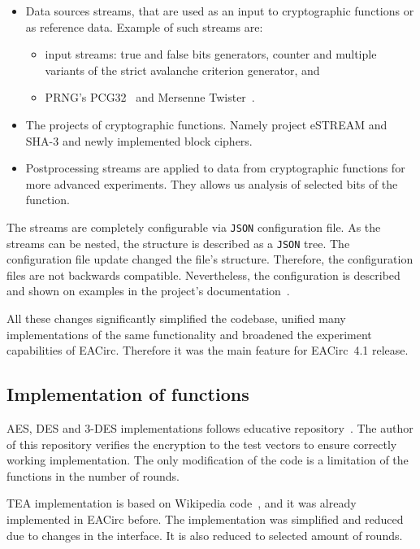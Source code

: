 \documentclass[
  print, %
  Table,   %
  nolof,     %
  nolot,     %
  11pt, %
  oneside  %
]{fithesis3}
\begin{document}
\begin{itemize}
    \item Data sources streams, that are used as an input to cryptographic functions or as reference data. Example of such streams are:
    \begin{itemize}
        \item input streams: true and false bits generators, counter and multiple variants of the strict avalanche criterion generator, and
        \item PRNG's PCG32~\cite{pcgGen} and Mersenne Twister~\cite{matsumoto1998mersenne}.
    \end{itemize}
    \item The projects of cryptographic functions. Namely project eSTREAM and SHA-3 and newly implemented block ciphers.
    \item Postprocessing streams are applied to data from cryptographic functions for more advanced experiments. They allows us analysis of selected bits of the function.
\end{itemize}

The streams are completely configurable via \texttt{JSON} configuration file. As the streams can be nested, the structure is described as a \texttt{JSON} tree. The configuration file update changed the file's structure. Therefore, the configuration files are not backwards compatible. Nevertheless, the configuration is described and shown on examples in the project's documentation~\cite{EACirc-wiki-streams}.

All these changes significantly simplified the codebase, unified many implementations of the same functionality and broadened the experiment capabilities of EACirc. Therefore it was the main feature for EACirc~4.1 release.

\subsection{Implementation of functions}
\label{subsec:method-data-funcs}

AES, DES and 3-DES implementations follows educative repository~\cite{cryptoFunc}. The author of this repository verifies the encryption to the test vectors to ensure correctly working implementation. The only modification of the code is a limitation of the functions in the number of rounds.

TEA implementation is based on Wikipedia code~\cite{teaWiki}, and it was already implemented in EACirc before. The implementation was simplified and reduced due to changes in the interface. It is also reduced to selected amount of rounds.
\end{document}
